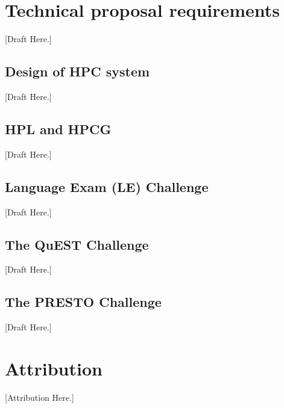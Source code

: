 \documentclass[a4paper, 11pt]{article}
\begin{document}
	\section{Technical proposal requirements}
		[Draft Here.]
		\subsection{Design of HPC system} [Draft Here.]
		\subsection{HPL and HPCG} [Draft Here.]
		\subsection{Language Exam (LE) Challenge} [Draft Here.]
		\subsection{The QuEST Challenge} [Draft Here.]
		\subsection{The PRESTO Challenge} [Draft Here.]

	\section*{Attribution} [Attribution Here.]



\end{document}
